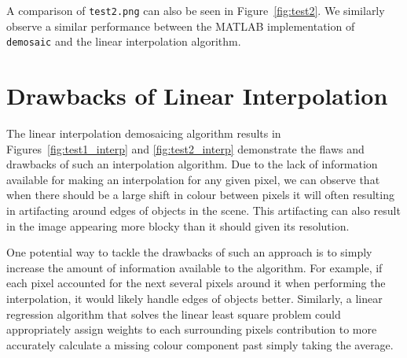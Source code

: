 \documentclass[12pt]{article}
\begin{document}
A comparison of \texttt{test2.png} can also be seen in Figure~\ref{fig:test2}. We similarly observe a similar performance between the MATLAB implementation of \texttt{demosaic} and the linear interpolation algorithm.

\section*{Drawbacks of Linear Interpolation}
The linear interpolation demosaicing algorithm results in Figures~\ref{fig:test1_interp} and \ref{fig:test2_interp} demonstrate the flaws and drawbacks of such an interpolation algorithm. Due to the lack of information available for making an interpolation for any given pixel, we can observe that when there should be a large shift in colour between pixels it will often resulting in artifacting around edges of objects in the scene. This artifacting can also result in the image appearing more blocky than it should given its resolution.

One potential way to tackle the drawbacks of such an approach is to simply increase the amount of information available to the algorithm. For example, if each pixel accounted for the next several pixels around it when performing the interpolation, it would likely handle edges of objects better. Similarly, a linear regression algorithm that solves the linear least square problem could appropriately assign weights to each surrounding pixels contribution to more accurately calculate a missing colour component past simply taking the average.
\end{document}

